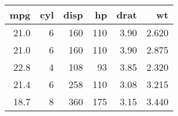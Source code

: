 
\begin{tabular}{rrrrrr}
\toprule
mpg & cyl & disp & hp & drat & wt\\
\midrule
21.0 & 6 & 160 & 110 & 3.90 & 2.620\\
21.0 & 6 & 160 & 110 & 3.90 & 2.875\\
22.8 & 4 & 108 & 93 & 3.85 & 2.320\\
21.4 & 6 & 258 & 110 & 3.08 & 3.215\\
18.7 & 8 & 360 & 175 & 3.15 & 3.440\\
\bottomrule
\end{tabular}
